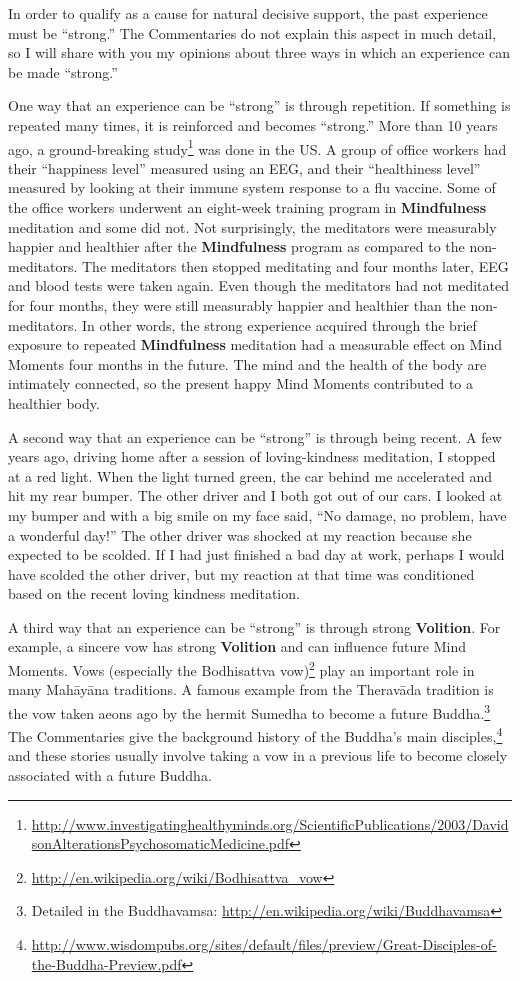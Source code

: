 In order to qualify as a cause for natural decisive support, the past experience must be “strong.” The Commentaries do not explain this aspect in much detail, so I will share with you my opinions about three ways in which an experience can be made “strong.”

\pagebreak

One way that an experience can be “strong” is through repetition. If something is repeated many times, it is reinforced and becomes “strong.” More than 10 years ago, a ground-breaking study\footnote{\url{http://www.investigatinghealthyminds.org/ScientificPublications/2003/DavidsonAlterationsPsychosomaticMedicine.pdf}} was done in the US. A group of office workers had their “happiness level” measured using an EEG, and their “healthiness level” measured by looking at their immune system response to a flu vaccine. Some of the office workers underwent an eight-week training program in \textbf{Mindfulness} meditation and some did not. Not surprisingly, the meditators were measurably happier and healthier after the \textbf{Mindfulness} program as compared to the non-meditators. The meditators then stopped meditating and four months later, EEG and blood tests were taken again. Even though the meditators had not meditated for four months, they were still measurably happier and healthier than the non-meditators. In other words, the strong experience acquired through the brief exposure to repeated \textbf{Mindfulness} meditation had a measurable effect on Mind Moments four months in the future. The mind and the health of the body are intimately connected, so the present happy Mind Moments contributed to a healthier body.

A second way that an experience can be “strong” is through being recent. A few years ago, driving home after a session of loving-kindness meditation, I stopped at a red light. When the light turned green, the car behind me accelerated and hit my rear bumper. The other driver and I both got out of our cars. I looked at my bumper and with a big smile on my face said, “No damage, no problem, have a wonderful day!” The other driver was shocked at my reaction because she expected to be scolded. If I had just finished a bad day at work, perhaps I would have scolded the other driver, but my reaction at that time was conditioned based on the recent loving kindness meditation.

A third way that an experience can be “strong” is through strong \textbf{Volition}. For example, a sincere vow has strong \textbf{Volition} and can influence future Mind Moments. Vows (especially the Bodhisattva vow)\footnote{\url{http://en.wikipedia.org/wiki/Bodhisattva_vow}} play an important role in many Mahāyāna traditions. A famous example from the Theravāda tradition is the vow taken aeons ago by the hermit Sumedha to become a future Buddha.\footnote{Detailed in the Buddhavamsa: \url{http://en.wikipedia.org/wiki/Buddhavamsa}} The Commentaries give the background history of the Buddha’s main disciples,\footnote{\url{http://www.wisdompubs.org/sites/default/files/preview/Great-Disciples-of-the-Buddha-Preview.pdf}} and these stories usually involve taking a vow in a previous life to become closely associated with a future Buddha.

